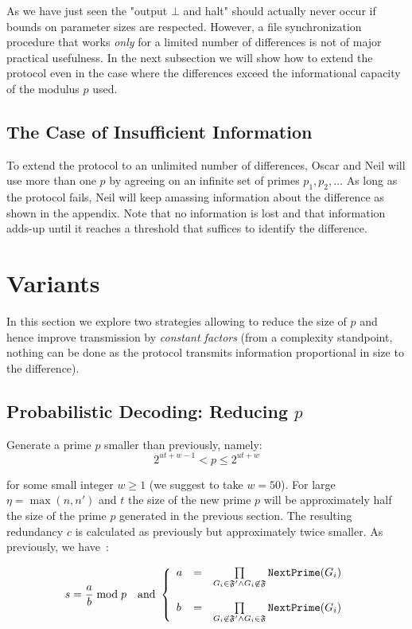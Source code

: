 \documentclass[11pt]{llncs}
\begin{document}
As we have just seen the "output $\bot$ and halt" should actually never occur if bounds on parameter sizes are respected. However, a file synchronization procedure that works {\sl only} for a limited number of differences is not of major practical usefulness. In the next subsection we will show how to extend the protocol even in the case where the differences exceed the informational capacity of the modulus $p$ used.

\subsection{The Case of Insufficient Information}

To extend the protocol to an unlimited number of differences, Oscar and Neil will use more than one $p$ by agreeing on an infinite set of primes $p_1,p_2,\ldots$ As long as the protocol fails, Neil will keep amassing information about the difference as shown in the appendix. Note that no information is lost and that information adds-up until it reaches a threshold that suffices to identify the difference.

\section{Variants}

In this section we explore two strategies allowing to reduce the size of $p$ and hence improve transmission by {\sl constant factors} (from a complexity standpoint, nothing can be done as the protocol transmits information proportional in size to the difference).

\subsection{Probabilistic Decoding: Reducing $p$}

Generate a prime $p$ smaller than previously, namely:
\begin{equation}
\label{eqnewp}
2^{ut+w-1}<p \leq 2^{ut+w}
\end{equation}

for some small integer $w \geq 1$ (we suggest to take $w=50$). For large $\eta=\max(n,n')$ and $t$ the size of the new prime $p$ will be approximately half the size of the prime $p$ generated in the previous section. The resulting redundancy $c$ is calculated as previously but approximately twice smaller. As previously, we have~:

$$
s=\frac{a}{b} \bmod p{~~~\mbox{and~}}
\left\{
\begin{array}{lcr}
a & =&  \prod\limits_{G_i \in \mathfrak{F}'\wedge G_i \not\in\mathfrak{F}} \mbox{{\tt NextPrime}}(G_i) \\
\\
b & = & \prod\limits_{G_i \not\in\mathfrak{F}' \wedge G_i \in\mathfrak{F}} \mbox{{\tt NextPrime}}(G_i)
\end{array}
\right.
$$
\end{document}
